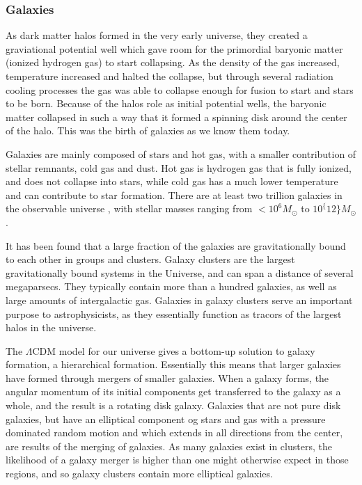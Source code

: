 \subsubsection{Galaxies}
As dark matter halos formed in the very early universe, they created a graviational potential well which gave room for the primordial baryonic matter (ionized hydrogen gas) to start collapsing. As the density of the gas increased, temperature increased and halted the collapse, but through several radiation cooling processes the gas was able to collapse enough for fusion to start and stars to be born. Because of the halos role as initial potential wells, the baryonic matter collapsed in such a way that it formed a spinning disk around the center of the halo. This was the birth of galaxies as we know them today.

Galaxies are mainly composed of stars and hot gas, with a smaller contribution of stellar remnants, cold gas and dust. Hot gas is hydrogen gas that is fully ionized, and does not collapse into stars, while cold gas has a much lower temperature and can contribute to star formation. There are at least two trillion galaxies in the observable universe \parencite{Conselice2016}, with stellar masses ranging from $<10^6 M_{\odot}$ to $10^\{12\} M_{\odot}$. 

It has been found that a large fraction of the galaxies are gravitationally bound to each other in groups and clusters. %
Galaxy clusters are the largest gravitationally bound systems in the Universe, and can span a distance of several megaparsecs. They typically contain more than a hundred galaxies, as well as large amounts of intergalactic gas. Galaxies in galaxy clusters serve an important purpose to astrophysicists, as they essentially function as tracors of the largest halos in the universe.

The $\Lambda$CDM model for our universe gives a bottom-up solution to galaxy formation, a hierarchical formation. Essentially this means that larger galaxies have formed through mergers of smaller galaxies. When a galaxy forms, the angular momentum of its initial components get transferred to the galaxy as a whole, and the result is a rotating disk galaxy. Galaxies that are not pure disk galaxies, but have an elliptical component og stars and gas with a pressure dominated random motion and which extends in all directions from the center, are results of the merging of galaxies. As many galaxies exist in clusters, the likelihood of a galaxy merger is higher than one might otherwise expect in those regions, and so galaxy clusters contain more elliptical galaxies.

